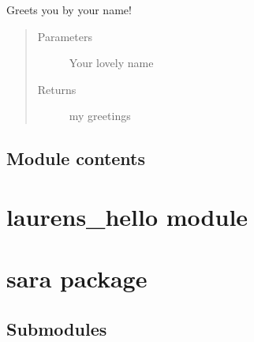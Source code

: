 \documentclass[letterpaper,10pt,english]{sphinxmanual}
\begin{document}

\begin{fulllineitems}
\label{\detokenize{laurens:laurens.hello.hello_world}}
Greets you by your name!
\begin{quote}\begin{description}
\item[{Parameters}] \leavevmode
{} \textendash{} Your lovely name

\item[{Returns}] \leavevmode
my greetings

\end{description}\end{quote}

\end{fulllineitems}



\subsection{Module contents}
\label{\detokenize{laurens:module-laurens}}\label{\detokenize{laurens:module-contents}}

\section{laurens\_hello module}
\label{\detokenize{laurens_hello:module-laurens_hello}}\label{\detokenize{laurens_hello:laurens-hello-module}}\label{\detokenize{laurens_hello::doc}}

\section{sara package}
\label{\detokenize{sara:sara-package}}\label{\detokenize{sara::doc}}

\subsection{Submodules}
\label{\detokenize{sara:submodules}}
\end{document}
